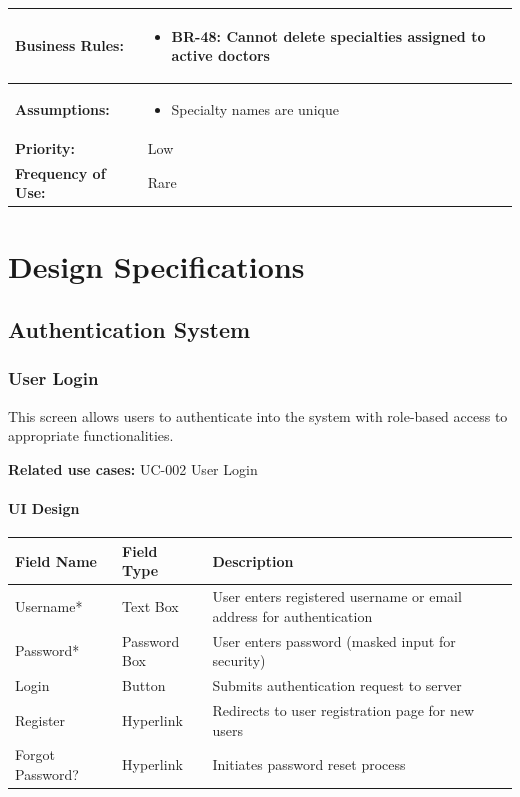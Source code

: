 \documentclass[12pt,a4paper]{article}
\begin{document}
\begin{longtable}{|p{4.5cm}|p{10.5cm}|}
\hline
\textbf{Business Rules:} &
\begin{itemize}
  \item BR-48: Cannot delete specialties assigned to active doctors
\end{itemize} \\
\hline
\textbf{Assumptions:} &
\begin{itemize}
  \item Specialty names are unique
\end{itemize} \\
\hline
\textbf{Priority:} & Low \\
\hline
\textbf{Frequency of Use:} & Rare \\
\hline
\end{longtable}



\section{Design Specifications}

\subsection{Authentication System}

\subsubsection{User Login}

This screen allows users to authenticate into the system with role-based access to appropriate functionalities.

\textbf{Related use cases:} UC-002 User Login

\paragraph{UI Design}

\begin{longtable}{|p{3cm}|p{3cm}|p{8cm}|}
\hline
\textbf{Field Name} & \textbf{Field Type} & \textbf{Description} \\
\hline
Username* & Text Box & User enters registered username or email address for authentication \\
\hline
Password* & Password Box & User enters password (masked input for security) \\
\hline
Login & Button & Submits authentication request to server \\
\hline
Register & Hyperlink & Redirects to user registration page for new users \\
\hline
Forgot Password? & Hyperlink & Initiates password reset process \\
\hline
\end{longtable}
\end{document}
